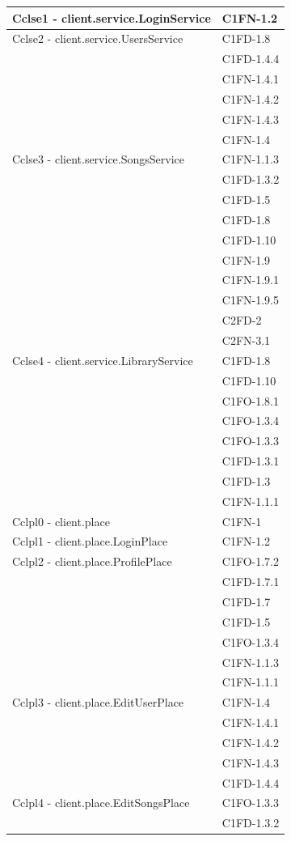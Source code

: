 \begin{footnotesize}
\begin{longtable}[!h]{|l|l|}
Cclse1 - client.service.LoginService & C1FN-1.2 \\\hline
Cclse2 - client.service.UsersService & C1FD-1.8 \\
& C1FD-1.4.4 \\
& C1FN-1.4.1 \\
& C1FN-1.4.2 \\
& C1FN-1.4.3 \\
& C1FN-1.4 \\\hline
Cclse3 - client.service.SongsService & C1FN-1.1.3 \\
& C1FD-1.3.2 \\
& C1FD-1.5 \\
& C1FD-1.8 \\
& C1FD-1.10 \\
& C1FN-1.9 \\
& C1FN-1.9.1 \\\
& C1FN-1.9.5 \\
& C2FD-2 \\
& C2FN-3.1 \\\hline
Cclse4 - client.service.LibraryService & C1FD-1.8 \\
& C1FD-1.10 \\
& C1FO-1.8.1 \\
& C1FO-1.3.4 \\
& C1FO-1.3.3 \\
& C1FD-1.3.1 \\
& C1FD-1.3 \\
& C1FN-1.1.1 \\\hline
Cclpl0 - client.place & C1FN-1 \\\hline
Cclpl1 - client.place.LoginPlace & C1FN-1.2 \\\hline
Cclpl2 - client.place.ProfilePlace & C1FO-1.7.2 \\
& C1FD-1.7.1 \\
& C1FD-1.7 \\
& C1FD-1.5 \\
& C1FO-1.3.4 \\
& C1FN-1.1.3 \\
& C1FN-1.1.1 \\\hline
Cclpl3 - client.place.EditUserPlace & C1FN-1.4 \\
& C1FN-1.4.1 \\
& C1FN-1.4.2 \\
& C1FN-1.4.3 \\
& C1FD-1.4.4 \\\hline
Cclpl4 - client.place.EditSongsPlace & C1FO-1.3.3 \\
& C1FD-1.3.2 \\

\end{longtable}
\end{footnotesize}
